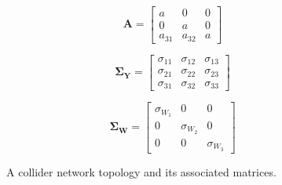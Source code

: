 \documentclass{article}
\begin{document}
\begin{figure}[H]
\centering

\def\figscale{1}

\begin{minipage}[c]{0.23\textwidth}
\centering

\def\a{1.2 cm}
\def\nodeSize{0.7}
\def\selfLoopR{0.5*\nodeSize cm}


\end{minipage}%
\hspace{0\textwidth}%
\begin{minipage}[c]{0.23\textwidth}
\raggedright

\[
\mathbf{A}=
\begin{bmatrix}
a & 0 & 0 \\
0 & a & 0 \\
a_{31} & a_{32} & a
\end{bmatrix}
\]

\end{minipage}%
\hspace{0.005\textwidth}%
\begin{minipage}[c]{0.25\textwidth}
\raggedright

\[
\mathbf{\Sigma_Y}=
\begin{bmatrix}
\sigma_{11} & \sigma_{12} & \sigma_{13} \\
\sigma_{21} & \sigma_{22} & \sigma_{23} \\
\sigma_{31} & \sigma_{32} & \sigma_{33}
\end{bmatrix}
\]

\end{minipage}%
\hspace{0.005\textwidth}%
\begin{minipage}[c]{0.27\textwidth}
\raggedright

\[
\mathbf{\Sigma_W}=
\begin{bmatrix}
\sigma_{W_1} & 0 & 0 \\
0 & \sigma_{W_2} & 0 \\
0 & 0 & \sigma_{W_3}
\end{bmatrix}
\]

\end{minipage}%

\caption{A collider network topology and its associated matrices.}
\label{fig:network_collider}
\end{figure}
\end{document}
